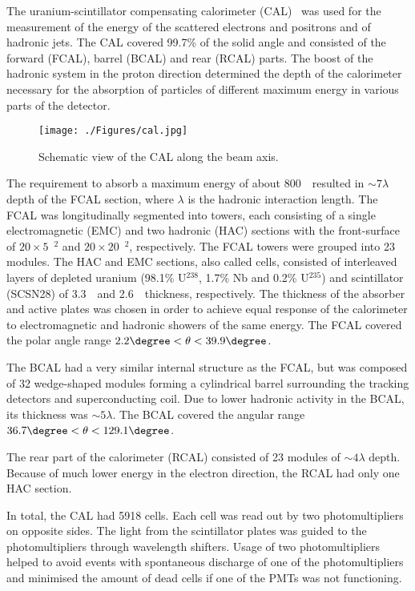 The uranium-scintillator compensating calorimeter (CAL)~\cite{thesis:kruger:1992,nim:a309:77,nim:a309:101,nim:a321:356,nim:a336:23} was used for the measurement of the energy of the scattered electrons and positrons and of hadronic jets. The CAL covered 99.7\% of the solid angle and consisted of the forward (FCAL), barrel (BCAL) and rear (RCAL) parts. The boost of the hadronic system in the proton direction determined the depth of the calorimeter necessary for the absorption of particles of different maximum energy in various parts of the detector.
\begin{figure}[h]
	\centering
		\texttt{[image: ./Figures/cal.jpg]}
	\caption{Schematic view of the CAL along the beam axis.}
	\label{fig:cal}
\end{figure}

The requirement to absorb a maximum energy of about 800~\GeV\, resulted in $\sim 7 \lambda$ depth of the FCAL section, where $\lambda$ is the hadronic interaction length. The FCAL was longitudinally segmented into towers, each consisting of a single electromagnetic (EMC) and two hadronic (HAC) sections with the front-surface of $20 \times 5$~\cm$^{2}$ and $20 \times 20$~\cm$^{2}$, respectively. The FCAL towers were grouped into 23 modules. The HAC and EMC sections, also called cells, consisted of interleaved layers of depleted uranium (98.1\% U$^{238}$, 1.7\% Nb and 0.2\% U$^{235}$) and scintillator (SCSN28) of 3.3~\mm\, and 2.6~\mm\, thickness, respectively. The thickness of the absorber and active plates was chosen in order to achieve equal response of the calorimeter to electromagnetic and hadronic showers of the same energy. The FCAL covered the polar angle range $2.2\degree < \theta < 39.9\degree$.

The BCAL had a very similar internal structure as the FCAL, but was composed of 32 wedge-shaped modules forming a cylindrical barrel surrounding the tracking detectors and superconducting coil. Due to lower hadronic activity in the BCAL, its thickness was $\sim 5 \lambda$. The BCAL covered the angular range $36.7\degree< \theta <129.1\degree$.

The rear part of the calorimeter (RCAL) consisted of 23 modules of $\sim 4 \lambda$ depth. Because of much lower energy in the electron direction, the RCAL had only one HAC section.

In total, the CAL had 5918 cells. Each cell was read out by two photomultipliers on opposite sides. The light from the scintillator plates was guided to the photomultipliers through wavelength shifters. Usage of two photomultipliers helped to avoid events with spontaneous discharge of one of the photomultipliers and minimised the amount of dead cells if one of the PMTs was not functioning.


